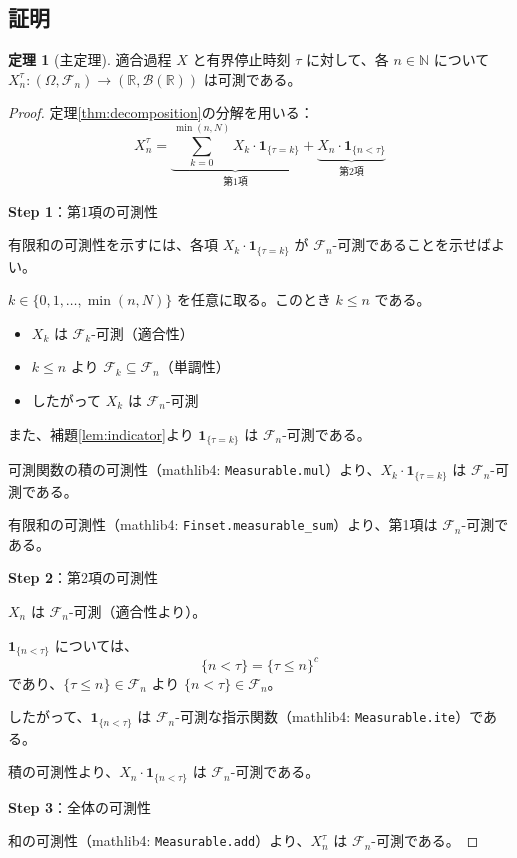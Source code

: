 \documentclass[a4paper,12pt]{ltjsarticle}
\theoremstyle{definition}
\newtheorem{theorem}{定理}[section]
\newcommand{\R}{\mathbb{R}}
\newcommand{\N}{\mathbb{N}}
\newcommand{\F}{\mathcal{F}}
\newcommand{\one}{\mathbf{1}}
\begin{document}
\subsection{証明}

\begin{theorem}[主定理]\label{thm:main}
適合過程 $X$ と有界停止時刻 $\tau$ に対して、各 $n \in \N$ について $X^\tau_n : (\Omega, \F_n) \to (\R, \mathcal{B}(\R))$ は可測である。
\end{theorem}

\begin{proof}
定理\ref{thm:decomposition}の分解を用いる：
\[
X^\tau_n = \underbrace{\sum_{k=0}^{\min(n,N)} X_k \cdot \one_{\{\tau = k\}}}_{\text{第1項}} + \underbrace{X_n \cdot \one_{\{n < \tau\}}}_{\text{第2項}}
\]

\textbf{Step 1}：第1項の可測性

有限和の可測性を示すには、各項 $X_k \cdot \one_{\{\tau = k\}}$ が $\F_n$-可測であることを示せばよい。

$k \in \{0, 1, \ldots, \min(n,N)\}$ を任意に取る。このとき $k \leq n$ である。

\begin{itemize}
\item $X_k$ は $\F_k$-可測（適合性）
\item $k \leq n$ より $\F_k \subseteq \F_n$（単調性）
\item したがって $X_k$ は $\F_n$-可測
\end{itemize}

また、補題\ref{lem:indicator}より $\one_{\{\tau = k\}}$ は $\F_n$-可測である。

可測関数の積の可測性（mathlib4: \texttt{Measurable.mul}）より、$X_k \cdot \one_{\{\tau = k\}}$ は $\F_n$-可測である。

有限和の可測性（mathlib4: \texttt{Finset.measurable\_sum}）より、第1項は $\F_n$-可測である。

\textbf{Step 2}：第2項の可測性

$X_n$ は $\F_n$-可測（適合性より）。

$\one_{\{n < \tau\}}$ については、
\[
\{n < \tau\} = \{\tau \leq n\}^c
\]
であり、$\{\tau \leq n\} \in \F_n$ より $\{n < \tau\} \in \F_n$。

したがって、$\one_{\{n < \tau\}}$ は $\F_n$-可測な指示関数（mathlib4: \texttt{Measurable.ite}）である。

積の可測性より、$X_n \cdot \one_{\{n < \tau\}}$ は $\F_n$-可測である。

\textbf{Step 3}：全体の可測性

和の可測性（mathlib4: \texttt{Measurable.add}）より、$X^\tau_n$ は $\F_n$-可測である。
\end{proof}
\end{document}
